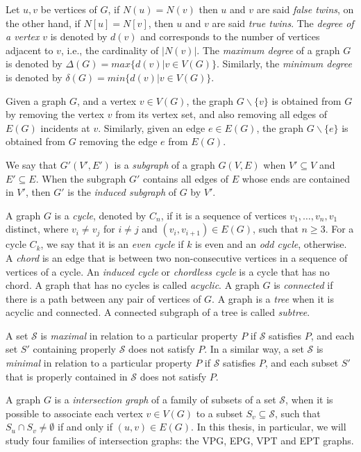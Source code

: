 Let $u, v$  be vertices of $G$, if $N(u) = N(v)$ then $u$ and $v$ are said \emph{false twins}, on the other hand, if $N[u] = N[v]$, then $u$ and $v$ are said \emph{true twins}. The \emph{degree of a  vertex} $v$ is denoted  by $d(v)$ and corresponds to the number of vertices adjacent to $v$, i.e., the cardinality of $|N(v)|$. The \emph{maximum degree} of a graph $G$ is denoted by $\Delta(G) = max\{d(v) | v \in V(G)\}$. Similarly, the  \emph{minimum degree} is denoted by  $\delta(G) = min\{d(v) | v \in V(G)\}$.

Given a graph $G$, and a vertex $v \in V(G)$, the graph $G\backslash \{v\}$ is obtained from $G$ by removing the vertex $v$ from its vertex set, and also removing all edges of $E(G)$ incidents at $v$. Similarly, given an edge $e \in E(G)$, the graph $G\backslash \{e\}$ is obtained from $G$ removing the edge $e$ from $E(G)$.

We say that $G'(V',E')$ is a \emph{subgraph} of a graph $G(V,E)$ when $V'\subseteq V$ and $E'\subseteq E$. When the subgraph $G'$ contains all edges of $E$ whose ends are contained in $V'$, then  $G'$ is the \emph{induced subgraph} of $G$ by $V'$.  

A graph  $G$ is a \emph{cycle}, denoted by $C_n$, if it is a sequence of vertices   $v_1, \dots, v_n, v_1$ distinct, where $v_i \neq v_j$ for $i\neq j$ and $(v_i, v_{i+1})\in E(G)$,  such that $n\geq 3$. For a cycle $C_k$, we say that it is an
\emph{even cycle} if $k$ is even and an \emph{odd cycle}, otherwise. A \emph{chord} is an edge that is between two non-consecutive vertices in a sequence of vertices of a cycle. An \emph{induced cycle}  or \emph{chordless cycle} is a cycle that has no chord. A graph that has no cycles is called \emph{acyclic}. A  graph $ G $ is \emph{connected} if there is a path between any pair of  vertices of $ G $. A graph is a \emph{tree} when it is acyclic and connected. A connected subgraph of a tree is called \emph{subtree}.

A set $\mathcal{S}$ is \emph{maximal} in relation to a particular property $P$ if $\mathcal{S}$ satisfies $P$, and each set $S'$ containing properly $\mathcal{S}$ does not satisfy $P$. In a similar way, a set $\mathcal{S}$ is \emph{minimal} in relation to a particular property $P$ if $\mathcal{S}$ satisfies $P$, and each subset  $S'$ that is properly contained in $\mathcal{S}$ does not satisfy $P$.

A graph $G$ is a \emph{intersection graph} of a family of subsets of a set $\mathcal{S}$, when it is possible to associate each vertex $v \in V(G)$ to a subset $S_v \subseteq \mathcal{S}$, such that $S_u \cap S_v \neq \emptyset$ if and only if $(u,v)\in E(G)$.  In this thesis, in particular, we will study four families of intersection graphs: the VPG, EPG, VPT and EPT graphs.


